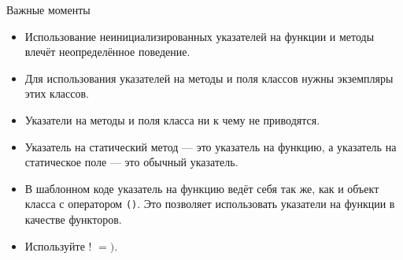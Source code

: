 \documentclass[aspectration=1610,t]{beamer}
\begin{document}
\begin{frame}[fragile]{Важные моменты}
\begin{itemize}
    \pause\item Использование неинициализированных указателей на функции и методы
        влечёт неопределённое поведение.

    \pause\item Для использования указателей на методы и поля классов нужны экземпляры
        этих классов.

    \pause\item Указатели на методы и поля класса ни к чему не приводятся.
    
    \pause\item Указатель на статический метод — это указатель на функцию, а указатель на статическое поле — это обычный указатель.

    \pause\item В шаблонном коде указатель на функцию ведёт себя так же, как
        и объект класса с оператором \texttt{()}. Это позволяет использовать
        указатели на функции в качестве функторов.

        \pause\item Используйте ! $=)$.
\end{itemize}
\end{frame}

\end{document}
